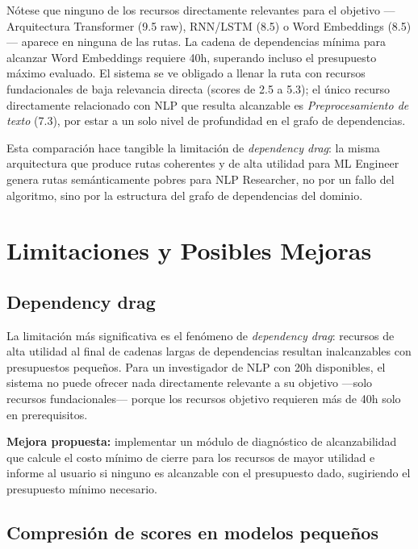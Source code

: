 \documentclass[11pt, a4paper]{article}
\begin{document}
Nótese que ninguno de los recursos directamente relevantes para el objetivo
—Arquitectura Transformer (9.5 raw), RNN/LSTM (8.5) o Word Embeddings
(8.5)— aparece en ninguna de las rutas. La cadena de dependencias mínima
para alcanzar Word Embeddings requiere 40h, superando incluso el presupuesto
máximo evaluado. El sistema se ve obligado a llenar la ruta con recursos
fundacionales de baja relevancia directa (scores de 2.5 a 5.3); el único
recurso directamente relacionado con NLP que resulta alcanzable es
\emph{Preprocesamiento de texto} (7.3), por estar a un solo nivel de
profundidad en el grafo de dependencias.

Esta comparación hace tangible la limitación de \emph{dependency drag}: la
misma arquitectura que produce rutas coherentes y de alta utilidad para ML
Engineer genera rutas semánticamente pobres para NLP Researcher, no por un
fallo del algoritmo, sino por la estructura del grafo de dependencias del
dominio.

\section{Limitaciones y Posibles Mejoras}

\subsection{Dependency drag}

La limitación más significativa es el fenómeno de \emph{dependency drag}: recursos de alta utilidad al final de cadenas largas de dependencias resultan inalcanzables con presupuestos pequeños. Para un investigador de NLP con 20h disponibles, el sistema no puede ofrecer nada directamente relevante a su objetivo —solo recursos fundacionales— porque los recursos objetivo requieren más de 40h solo en prerequisitos.

\begin{notebox}
\textbf{Mejora propuesta:} implementar un módulo de diagnóstico de alcanzabilidad que calcule el costo mínimo de cierre para los recursos de mayor utilidad e informe al usuario si ninguno es alcanzable con el presupuesto dado, sugiriendo el presupuesto mínimo necesario.
\end{notebox}

\subsection{Compresión de scores en modelos pequeños}
\end{document}
